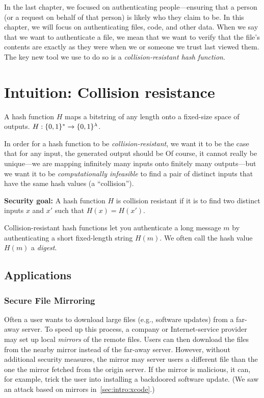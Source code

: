 In the last chapter, we focused on authenticating people---ensuring that
a person (or a request on behalf of that person) is likely who they claim to be.
In this chapter, we will focus on authenticating
files, code, and other data.
When we say that we want to authenticate a file,
we mean that we want to verify that the file's
contents are exactly as they were when we or
someone we trust last viewed them.
The key new tool we use to do so is a \textit{collision-resistant hash function}. 

\section{Intuition: Collision resistance}
\begin{definition}
	A hash function $H$ maps a bitstring of any length onto a fixed-size space of outputs. $H: \{0,1\}^* \rightarrow \{0,1\}^{\lambda}$.
\end{definition}

In order for a hash function to be \textit{collision-resistant}, we want it to be the case that for any input, the generated output should be  Of course, it cannot really be unique---we are mapping infinitely many inputs onto finitely many outputs---but we want it to be \textit{computationally infeasible} to find a 
pair of distinct inputs that have the same hash values (a ``collision'').

\begin{framed}
\noindent
\textbf{Security goal:} A hash function $H$ is collision resistant if
it is  to find two distinct inputs 
$x$ and $x'$ such that $H(x) = H(x')$.
\end{framed}

Collision-resistant hash functions let you authenticate 
a long message $m$ by authenticating a short fixed-length string $H(m)$.
We often call the hash value $H(m)$ a \emph{digest}.

\subsection{Applications}
\subsubsection{Secure File Mirroring}
Often a user wants to download large files (e.g., software updates) from a far-away server.
To speed up this process, a company or Internet-service provider may set up local \emph{mirrors}
of the remote files.
Users can then download the files from the nearby mirror instead of the far-away server.
However, without additional security measures, the mirror may 
server users a different file than the one the mirror fetched from the origin server.
If the mirror is malicious, it can, for example, trick the user into installing
a backdoored software update.
(We saw an attack based on mirrors in~\cref{sec:intro:xcode}.)

